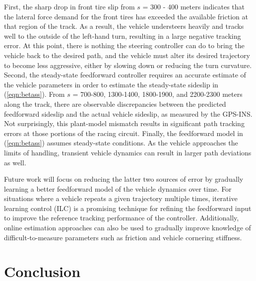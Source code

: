 \documentclass{nVSD2e}
\theoremstyle{plain}
\theoremstyle{definition}
\theoremstyle{remark}
\begin{document}
First, the sharp drop in front tire slip from $s$ = 300 - 400 meters indicates that the 
 lateral force demand for the front tires has exceeded the available friction at that region of the track. As a result, the vehicle
 understeers heavily and tracks well to the outside of the left-hand turn, resulting in a large negative tracking error.
At this point, there is nothing the steering controller can do to bring the vehicle back to the desired path, and the vehicle must alter its
desired trajectory to become less aggressive, either by slowing down or reducing the turn curvature. Second, the steady-state feedforward controller requires an accurate estimate of the vehicle parameters in order to estimate
the steady-state sideslip in (\ref{eqn:betass}). From $s$ = 700-800, 1300-1400, 1800-1900, and 2200-2300 meters along the track, there are observable
discrepancies between the predicted feedforward sideslip and the actual vehicle sideslip, as measured by the GPS-INS. Not surprisingly,
this plant-model mismatch results in significant path tracking errors at those portions of the racing circuit. Finally, the feedforward
model in (\ref{eqn:betass}) assumes steady-state conditions. As the vehicle approaches the limits of handling, transient vehicle
dynamics can result in larger path deviations as well.

Future work will focus on reducing the latter two sources of error by gradually learning a better feedforward model of the
vehicle dynamics over time. For situations where a vehicle repeats a given trajectory multiple times, iterative learning control (ILC)
is a promising technique for refining the feedforward input to improve the reference tracking performance of the controller. Additionally, online estimation
approaches can also be used to gradually improve knowledge of difficult-to-measure parameters such as friction and vehicle cornering
stiffness.

\section{Conclusion}
\end{document}
